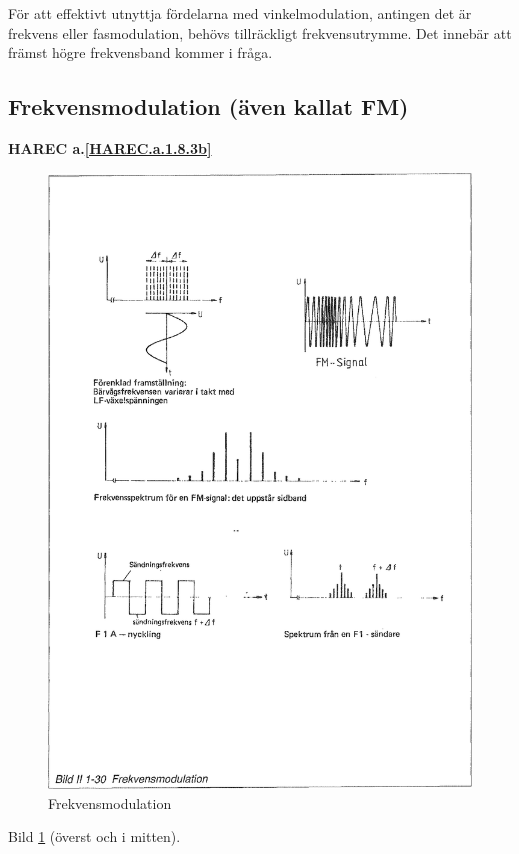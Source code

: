 För att effektivt utnyttja fördelarna med vinkelmodulation, antingen det är
frekvens eller fasmodulation, behövs tillräckligt frekvensutrymme. Det innebär
att främst högre frekvensband kommer i fråga.

\subsection{Frekvensmodulation (även kallat FM)}
\textbf{HAREC a.\ref{HAREC.a.1.8.3b}\label{myHAREC.a.1.8.3b}}

\begin{figure}
\includegraphics[width=\textwidth]{images/bild_2_1-30}
\caption{Frekvensmodulation}
\label{fig:BildII1-30}
\end{figure}

Bild \ref{fig:BildII1-30} (överst och i mitten).

